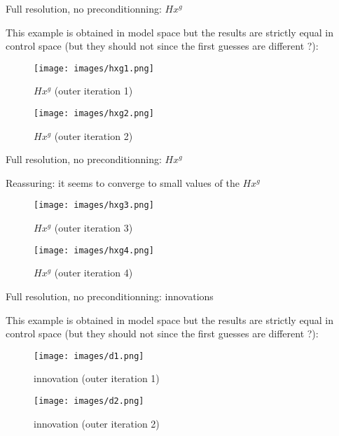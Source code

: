 \documentclass[francais]{beamer}
\begin{document}
\begin{frame}{Full resolution, no preconditionning: $H x^g$}
\begin{center}
This example is obtained in model space but the results are strictly equal in control space (but they should not since the first guesses are different ?):
\begin{figure}
  \texttt{[image: images/hxg1.png]}
  \caption{$H x^g$ (outer iteration 1)}
\endminipage\hfill
{}
  \texttt{[image: images/hxg2.png]}
  \caption{$H x^g$ (outer iteration 2)}
\endminipage
\end{figure}
\end{center}
\end{frame}

\begin{frame}{Full resolution, no preconditionning: $H x^g$}
\begin{center}
Reassuring: it seems to converge to small values of the $H x^g$
\begin{figure}
  \texttt{[image: images/hxg3.png]}
  \caption{$H x^g$ (outer iteration 3)}
\endminipage \hfill
{}%
  \texttt{[image: images/hxg4.png]}
  \caption{$H x^g$ (outer iteration 4)}
\endminipage
\end{figure}
\end{center}
\end{frame}

\begin{frame}{Full resolution, no preconditionning: innovations}
\begin{center}
This example is obtained in model space but the results are strictly equal in control space (but they should not since the first guesses are different ?):
\begin{figure}
  \texttt{[image: images/d1.png]}
  \caption{innovation (outer iteration 1)}
\endminipage\hfill
{}
  \texttt{[image: images/d2.png]}
  \caption{innovation (outer iteration 2)}
\endminipage
\end{figure}
\end{center}
\end{frame}
\end{document}
